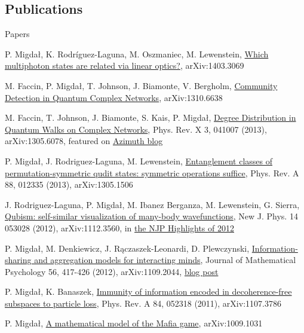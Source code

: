 \documentclass[margin,line]{resume}
\begin{document}
\begin{resume}
    \section{\mysidestyle Publications}
    Papers
    \begin{list2}
        \item P. Migdał, K. Rodríguez-Laguna, M. Oszmaniec, M. Lewenstein,
        \href{http://arxiv.org/abs/1403.3069}{Which multiphoton states are related via linear optics?}, arXiv:1403.3069
        \item M. Faccin, P. Migdał, T. Johnson, J. Biamonte, V. Bergholm,
        \href{http://arxiv.org/abs/1310.6638}{Community Detection in Quantum Complex Networks}, arXiv:1310.6638
        \item M. Faccin, T. Johnson, J. Biamonte, S. Kais, P. Migdał,
        \href{http://arxiv.org/abs/1305.6078}{Degree Distribution in Quantum Walks on Complex Networks},
        Phys. Rev. X 3, 041007 (2013),
        arXiv:1305.6078,
        featured on \href{http://johncarlosbaez.wordpress.com/2013/08/05/quantum-network-theory-part-1/}{Azimuth blog}
        \item P. Migdał, J. Rodriguez-Laguna, M. Lewenstein,
        \href{http://arxiv.org/abs/1305.1506}{Entanglement classes of permutation-symmetric qudit states: symmetric operations suffice},
        Phys. Rev. A 88, 012335 (2013), arXiv:1305.1506
        \item J. Rodriguez-Laguna, P. Migdał, M. Ibanez Berganza, M. Lewenstein, G. Sierra, \href{http://dx.doi.org/10.1088/1367-2630/14/5/053028}{Qubism: self-similar visualization of many-body wavefunctions}, New J. Phys. 14 053028 (2012), arXiv:1112.3560,
        in \href{http://iopscience.iop.org/1367-2630/page/Highlights%20of%202012}{the NJP Highlights of 2012}
		\item P. Migdał, M. Denkiewicz, J. Rączaszek-Leonardi, D. Plewczynski, \href{http://arxiv.org/abs/1109.2044}{Information-sharing and aggregation models for interacting minds},
        Journal of Mathematical Psychology 56, 417-426 (2012),
        arXiv:1109.2044,
        \href{http://egtheory.wordpress.com/2014/01/30/two-heads-are-better-than-one-how-about-more/}{blog post}
        \item P. Migdał, K. Banaszek, \href{http://arxiv.org/abs/1107.3786}{Immunity of information encoded in decoherence-free subspaces to particle loss}, Phys. Rev. A 84, 052318 (2011), arXiv:1107.3786
    	\item P. Migdał, \href{http://arxiv.org/abs/1009.1031}{A mathematical model of the Mafia game}, arXiv:1009.1031

\end{list2}
\end{resume}
\end{document}
